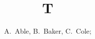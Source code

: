 \documentclass{amsart}
\begin{document}
\title{T}
\author{A.~Able, B.~Baker, C.~Cole;}
\address{Univ A}
\maketitle
\end{document}
